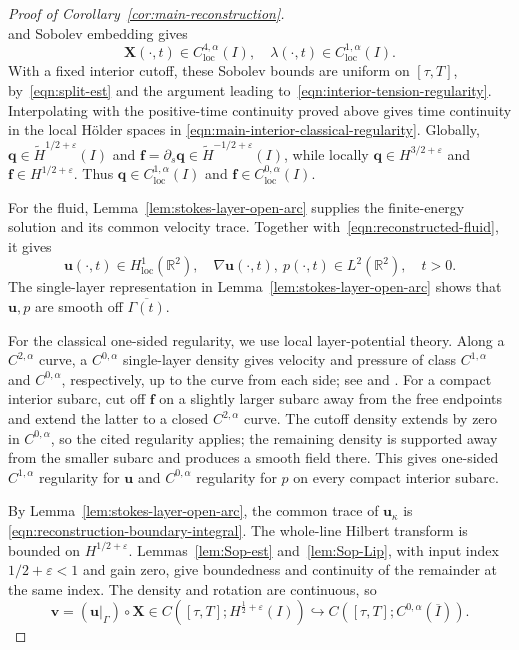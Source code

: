 \documentclass[11pt,reqno]{amsart}
\theoremstyle{plain}
\theoremstyle{definition}
\numberwithin{equation}{section}
\newcommand{\paren}[1]{\left(#1\right)}
\newcommand{\p}{\partial}
\newcommand{\grad}[1]{\nabla #1}
\newcommand{\wt}[1]{\widetilde{#1}}
\newcommand{\bm}[1]{\boldsymbol{#1}}
\newcommand{\R}{\mathbb{R}}
\newcommand{\thi}[1]{\wt H^{#1}(I)}
\begin{document}
\begin{proof}[Proof of Corollary~\ref{cor:main-reconstruction}]
\begin{equation}
\end{equation}
and Sobolev embedding gives
\begin{equation}\label{eqn:main-interior-classical-regularity}
    \bm X(\cdot,t)\in C_{\mathrm{loc}}^{4,\alpha}(I),
    \quad \lambda(\cdot,t)\in C_{\mathrm{loc}}^{1,\alpha}(I).
\end{equation}
With a fixed interior cutoff, these Sobolev bounds are
uniform on $[\tau,T]$, by~\eqref{eqn:split-est} and the argument leading to~\eqref{eqn:interior-tension-regularity}. Interpolating with the positive-time continuity proved above
gives time continuity in the local H\"older spaces in
\eqref{eqn:main-interior-classical-regularity}.
Globally, $\bm q\in\thi{1/2+\varepsilon}$ and
$\bm f=\p_s \bm q\in\thi{-1/2+\varepsilon}$, while locally
$\bm q\in H^{3/2+\varepsilon}$ and $\bm f\in H^{1/2+\varepsilon}$.
Thus $\bm q\in C^{1,\alpha}_{\mathrm{loc}}(I)$ and
$\bm f\in C^{0,\alpha}_{\mathrm{loc}}(I)$.

For the fluid, Lemma~\ref{lem:stokes-layer-open-arc} supplies the
finite-energy solution and its common velocity trace.
Together with~\eqref{eqn:reconstructed-fluid}, it gives
\begin{equation}\label{eqn:reconstruction-fluid-energy}
    \bm u(\cdot,t)\in H^1_{\mathrm{loc}}(\R^2),
    \quad \grad\bm u(\cdot,t),\ p(\cdot,t)\in L^2(\R^2),
    \quad t>0.
\end{equation}
The single-layer representation in Lemma~\ref{lem:stokes-layer-open-arc} shows that $\bm u,p$ are smooth off $\overline{\Gamma(t)}$.

For the classical one-sided regularity, we use local layer-potential theory.
Along a $C^{2,\alpha}$ curve, a $C^{0,\alpha}$ single-layer density
gives velocity and pressure of class $C^{1,\alpha}$ and $C^{0,\alpha}$,
respectively, up to the curve from each side; see
\cite[Section~2.3]{Hsiao2021} and
\cite[Theorem~2.1 and Appendix~A]{KuoLaiMoriRodenberg2023Tension}.
For a compact interior subarc, cut off $\bm f$ on a slightly larger
subarc away from the free endpoints and extend the latter to a closed
$C^{2,\alpha}$ curve. The cutoff density extends by zero in $C^{0,\alpha}$,
so the cited regularity applies; the remaining density is supported
away from the smaller subarc and produces a smooth field there.
This gives one-sided $C^{1,\alpha}$ regularity for $\bm u$ and
$C^{0,\alpha}$ regularity for $p$ on every compact interior subarc.

By Lemma~\ref{lem:stokes-layer-open-arc}, the common trace of
$\bm u_\kappa$ is \eqref{eqn:reconstruction-boundary-integral}.
The whole-line Hilbert transform is bounded on $H^{1/2+\varepsilon}$.
Lemmas~\ref{lem:Sop-est} and~\ref{lem:Sop-Lip}, with input index
$1/2+\varepsilon<1$ and gain zero, give boundedness and continuity
of the remainder at the same index. The density and rotation are
continuous, so
\begin{equation}\label{eqn:reconstruction-positive-time-trace}
    \bm v=(\bm u|_\Gamma)\circ\bm X
    \in C\paren{[\tau,T];H^{\frac12+\varepsilon}(I)}
    \hookrightarrow C\paren{[\tau,T];C^{0,\alpha}(\overline I)}.
\end{equation}


\end{proof}
\end{document}
